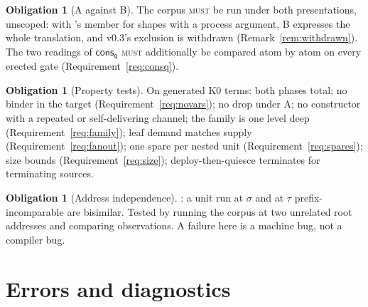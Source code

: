 \documentclass[11pt,a4paper]{article}
\newcommand{\MUST}{\textsc{must}}
\newcommand{\qq}{\mathsf{q}}
\newcommand{\cons}{\mathsf{cons}}
\theoremstyle{definition}
\newtheorem{obligation}[definition]{Obligation}
\theoremstyle{plain}
\begin{document}
\begin{obligation}[A against B]\label{obl:AB}
The corpus \MUST{} be run under both presentations, unscoped: with
\cite[Def.~3.8]{draft3}'s member for shapes with a process argument, B
expresses the whole translation, and v0.3's exclusion is withdrawn
(Remark~\ref{rem:withdrawn}). The two readings of $\cons_{\qq}$ \MUST{}
additionally be compared atom by atom on every erected gate
(Requirement~\ref{req:consq}).
\end{obligation}

\begin{obligation}[Property tests]\label{obl:prop}
On generated K0 terms: both phases total; no binder in the target
(Requirement~\ref{req:novars}); no drop under A; no constructor with a
repeated or self-delivering channel; the family is one level deep
(Requirement~\ref{req:family}); leaf demand matches supply
(Requirement~\ref{req:fanout}); one spare per nested unit
(Requirement~\ref{req:spares}); size bounds
(Requirement~\ref{req:size}); deploy-then-quiesce terminates for terminating
sources.
\end{obligation}

\begin{obligation}[Address independence]\label{obl:addr}
\cite[Lem.~7.8]{draft3}: a unit run at $\sigma$ and at $\tau$
prefix-incomparable are bisimilar. Tested by running the corpus at two
unrelated root addresses and comparing observations. A failure here is a
machine bug, not a compiler bug.
\end{obligation}

\section{Errors and diagnostics}\label{sec:errors}
\end{document}
